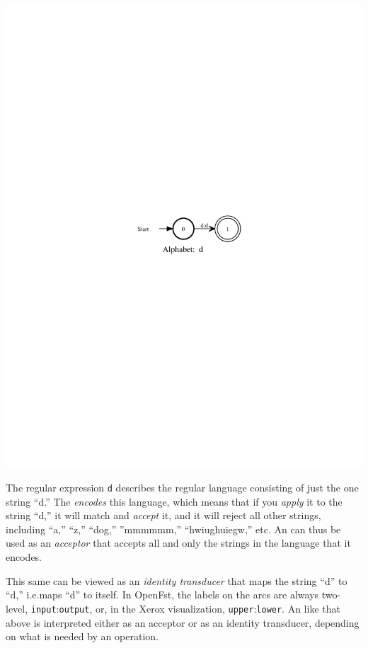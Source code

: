 \begin{center}
\includegraphics{images/d.pdf}
\end{center}

\noindent
The regular expression \texttt{d} describes the regular language consisting of just the
one string ``d.''  The \fsm{} \emph{encodes} this language, which means that if you
\emph{apply} it to the string ``d,'' it will match and \emph{accept} it, and it will reject all other
strings, including ``a,'' ``z,'' ``dog,'' ''mmmmmm,'' ``hwiughuiegw,'' etc.  An \fsm{}
can thus be used as an \emph{acceptor} that accepts all and only the strings in the
language that it encodes.

This same \fsm{} can be viewed as an \emph{identity transducer} that maps the string
``d'' to ``d,'' i.e.\@ maps ``d'' to itself.  In OpenFst, the labels on the arcs are always
two-level, \texttt{input}:\texttt{output}, or, in the Xerox visualization,
\texttt{upper}:\texttt{lower}.  An \fsm{} like that above is interpreted either as an acceptor
or as an identity transducer, depending on what is needed by an operation.

